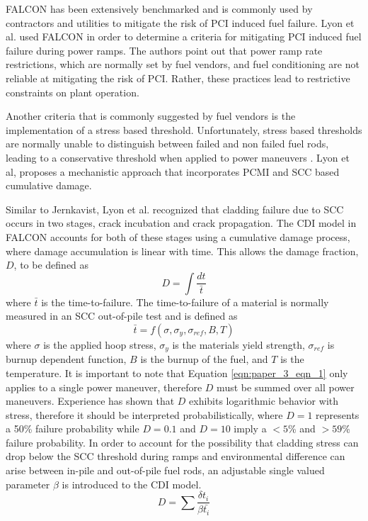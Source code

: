 \documentclass[edeposit,fullpage,11pt]{uiucthesis2009}
\begin{document}
FALCON has been extensively benchmarked and is commonly used by contractors and utilities to mitigate the risk of \gls{PCI} induced fuel failure.
Lyon et al. \cite{lyon_pci_2009} used FALCON in order to determine a criteria for mitigating \gls{PCI} induced fuel failure during power ramps.
The authors point out that power ramp rate restrictions, which are normally set by fuel vendors, and fuel conditioning are not reliable at mitigating the risk of \gls{PCI}. 
Rather, these practices lead to restrictive constraints on plant operation.

Another criteria that is commonly suggested by fuel vendors is the implementation of a stress based threshold.
Unfortunately, stress based thresholds are normally unable to distinguish between failed and non failed fuel rods, leading to a conservative threshold when applied to power maneuvers \cite{lyon_pci_2009}.
 Lyon et al, proposes a mechanistic approach that incorporates \gls{PCMI} and \gls{SCC} based cumulative damage.

Similar to Jernkavist,  Lyon et al. recognized that cladding failure due to \gls{SCC} occurs in two stages, crack incubation and crack propagation.
The \gls{CDI} model in FALCON accounts for both of these stages using a cumulative damage process, where damage accumulation is linear with time.
This allows the damage fraction, $D$, to be defined as 
\begin{equation}\label{eqn:paper_3_eqn_1}
D = \int \frac{dt}{\bar{t}}
\end{equation}
where $\bar{t}$ is the time-to-failure.
The time-to-failure of a material is normally measured in an \gls{SCC} out-of-pile test and is defined as
\begin{equation}
\bar{t} = f(\sigma,\sigma_y,\sigma_{ref},B,T)
\end{equation}
where $\sigma$ is the applied hoop stress, $\sigma_y$ is the materials yield strength, $\sigma_{ref}$ is burnup dependent function, $B$ is the burnup of the fuel, and $T$ is the temperature.
It is important to note that Equation \ref{eqn:paper_3_eqn_1} only applies to a single power maneuver, therefore $D$ must be summed over all power maneuvers. 
Experience has shown that $D$ exhibits logarithmic behavior with stress, therefore it should be interpreted probabilistically, where $D=1$ represents a 50\% failure probability while $D=0.1$ and $D=10$ imply a $<5$\% and $>59$\% failure probability.
In order to account for the possibility that cladding stress can drop below the \gls{SCC} threshold during ramps and environmental difference can arise between in-pile and out-of-pile fuel rods, an adjustable single valued parameter $\beta$ is introduced to the \gls{CDI} model. 
\begin{equation}
D = \sum \frac{\delta t_i}{\beta \bar{t_i}}
\end{equation}
\end{document}
